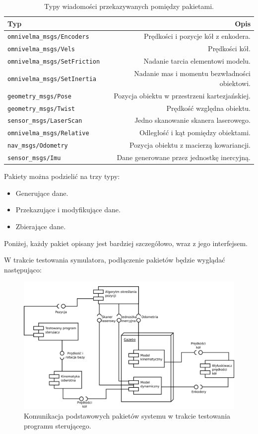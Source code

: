 \begin{table}
	\centering
	\begin{tabular}{l r}
		Typ & Opis \\
		\hline
		\texttt{omnivelma\_msgs/Encoders} & Prędkości i pozycje kół z enkodera. \\
		\texttt{omnivelma\_msgs/Vels} & Prędkości kół. \\
		\texttt{omnivelma\_msgs/SetFriction} & Nadanie tarcia elementowi modelu. \\
		\texttt{omnivelma\_msgs/SetInertia} & Nadanie mas i momentu bezwładności obiektowi. \\
		\texttt{geometry\_msgs/Pose} & Pozycja obiektu w przestrzeni kartezjańskiej. \\
		\texttt{geometry\_msgs/Twist} & Prędkość względna obiektu. \\
		\texttt{sensor\_msgs/LaserScan} & Jedno skanowanie skanera laserowego. \\
		\texttt{omnivelma\_msgs/Relative} & Odległość i kąt pomiędzy obiektami. \\
		\texttt{nav\_msgs/Odometry} & Pozycja obiektu z macierzą kowariancji. \\
		\texttt{sensor\_msgs/Imu} & Dane generowane przez jednostkę inercyjną. \\
	\end{tabular}
	\caption{Typy wiadomości przekazywanych pomiędzy pakietami.}
	\label{tab:messages}
\end{table}

Pakiety można podzielić na trzy typy:
\begin{itemize}
	\item Generujące dane.
	\item Przekazujące i modyfikujące dane.
	\item Zbierające dane.
\end{itemize}
Poniżej, każdy pakiet opisany jest bardziej szczegółowo, wraz z jego interfejsem.

W trakcie testowania symulatora, podłączenie pakietów będzie wyglądać następująco:
\begin{figure}[H]
	\centering
	\includegraphics[width=\textwidth]{uml/final.pdf}
	\caption{Komunikacja podstawowych pakietów systemu w trakcie testowania programu sterującego.}
\end{figure}

